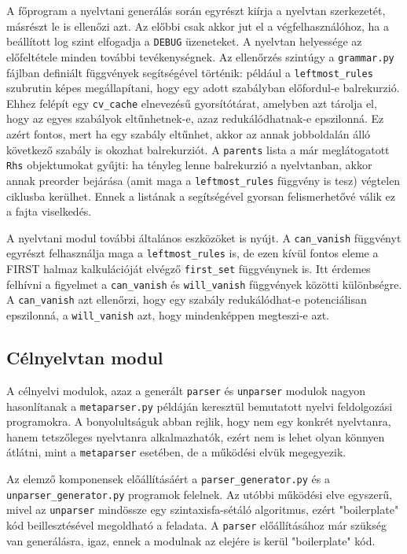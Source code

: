 \documentclass[twoside, 12pt]{report}
\begin{document}
A főprogram a nyelvtani generálás során egyrészt kiírja a nyelvtan szerkezetét, másrészt le is ellenőzi azt. Az előbbi csak akkor jut el a végfelhasználóhoz, ha a beállított log szint elfogadja a \verb|DEBUG| üzeneteket. A nyelvtan helyessége az előfeltétele minden további tevékenységnek. Az ellenőrzés szintúgy a \verb|grammar.py| fájlban definiált függvények segítségével történik: például a \verb|leftmost_rules| szubrutin képes megállapítani, hogy egy adott szabályban előfordul-e balrekurzió. Ehhez felépít egy \verb|cv_cache| elnevezésű gyorsítótárat, amelyben azt tárolja el, hogy az egyes szabályok eltűnhetnek-e, azaz redukálódhatnak-e epszilonná. Ez azért fontos, mert ha egy szabály eltűnhet, akkor az annak jobboldalán álló következő szabály is okozhat balrekurziót. A \verb|parents| lista a már meglátogatott \verb|Rhs| objektumokat gyűjti: ha tényleg lenne balrekurzió a nyelvtanban, akkor annak preorder bejárása (amit maga a \verb|leftmost_rules| függvény is tesz) végtelen ciklusba kerülhet. Ennek a listának a segítségével gyorsan felismerhetővé válik ez a fajta viselkedés.

A nyelvtani modul további általános eszközöket is nyújt. A \verb|can_vanish| függvényt egyrészt felhasználja maga a \verb|leftmost_rules| is, de ezen kívül fontos eleme a FIRST halmaz kalkulációját elvégző \verb|first_set| függvénynek is. Itt érdemes felhívni a figyelmet a \verb|can_vanish| és \verb|will_vanish| függvények közötti különbségre. A \verb|can_vanish| azt ellenőrzi, hogy egy szabály redukálódhat-e potenciálisan epszilonná, a \verb|will_vanish| azt, hogy mindenképpen megteszi-e azt.

\subsection{Célnyelvtan modul}

A célnyelvi modulok, azaz a generált \verb|parser| és \verb|unparser| modulok nagyon hasonlítanak a \verb|metaparser.py| példáján keresztül bemutatott nyelvi feldolgozási programokra. A bonyolultságuk abban rejlik, hogy nem egy konkrét nyelvtanra, hanem tetszőleges nyelvtanra alkalmazhatók, ezért nem is lehet olyan könnyen átlátni, mint a \verb|metaparser| esetében, de a működési elvük megegyezik.

Az elemző komponensek előállításáért a \verb|parser_generator.py| és a \verb|unparser_generator.py| programok felelnek. Az utóbbi működési elve egyszerű, mivel az \verb|unparser| mindössze egy szintaxisfa-sétáló algoritmus, ezért "boilerplate" kód beillesztésével megoldható a feladata. A \verb|parser| előállításához már szükség van generálásra, igaz, ennek a modulnak az elejére is kerül "boilerplate" kód.
\end{document}
